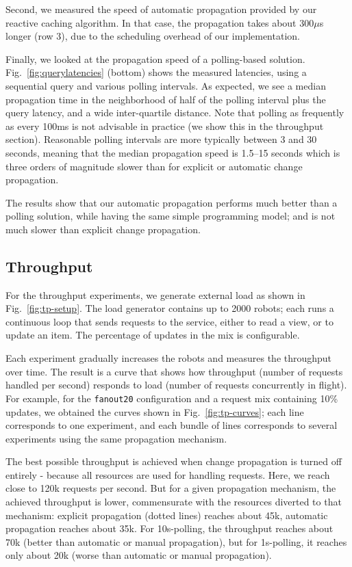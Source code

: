 Second, we measured the speed of automatic propagation provided by our reactive caching algorithm. In that case, the propagation takes about 300$\mu$s longer (row 3), due to the scheduling overhead of our implementation.

Finally, we looked at the propagation speed of a polling-based solution. Fig.~\ref{fig:querylatencies} (bottom) shows the measured latencies, using a sequential query and various polling intervals. As expected, we see a median propagation time in the neighborhood of half of the polling interval plus the query latency, and a wide inter-quartile distance. Note that polling as frequently as every 100ms is not advisable in practice (we show this in the throughput section). Reasonable polling intervals are more typically between 3 and 30 seconds, meaning that the median propagation speed is 1.5--15 seconds which is three orders of magnitude slower than for explicit or automatic change propagation.  

The results show that our automatic propagation performs much better than a polling solution, while having the same simple programming model; and is not much slower than explicit change propagation.

\subsection{Throughput}\label{sec:throughput}

For the throughput experiments, we generate external load as shown in Fig.~\ref{fig:tp-setup}. The load generator contains up to 2000 robots; each runs a continuous loop that sends requests to the service, either to read a view, or to update an item. The percentage of updates in the mix is configurable. 

Each experiment gradually increases the robots and measures the throughput over time. The result is a curve that shows how throughput (number of requests handled per second) responds to load (number of requests concurrently in flight). For example, for the \lstinline|fanout20| configuration and a request mix containing 10\% updates, we obtained the curves shown in Fig.~\ref{fig:tp-curves}; each line corresponds to one experiment, and each bundle of lines corresponds to several experiments using the same propagation mechanism. 

The best possible throughput is achieved when change propagation is turned off entirely - because all resources are used for handling requests. Here, we reach close to 120k requests per second. But for a given propagation mechanism, the achieved throughput is lower, commensurate with the resources diverted to that mechanism: explicit propagation (dotted lines) reaches about 45k, automatic  propagation reaches about 35k. For 10s-polling, the throughput reaches about 70k (better than automatic or manual propagation), but for 1s-polling, it reaches only about 20k (worse than automatic or manual propagation). 

